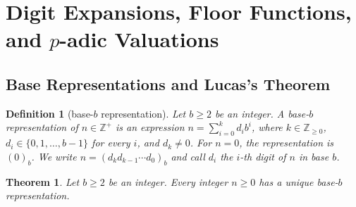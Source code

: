 \documentclass[11pt]{article}
\theoremstyle{ntstyle}
\newtheorem{theorem}{Theorem}[subsection]
\newtheorem{definition}{Definition}[subsection]
\begin{document}
\section{Digit Expansions, Floor Functions, and \texorpdfstring{$p$}{p}-adic Valuations}

\subsection{Base Representations and Lucas's Theorem}

\begin{definition}[base-$b$ representation]\label{def:4.1.1} Let $b\ge2$ be an integer.
	A base-$b$ representation of $n\in\mathbb{Z}^+$ is an expression
	$n=\sum_{i=0}^{k}d_i b^i$, where $k\in\mathbb{Z}_{\ge0}$,
	$d_i\in\{0,1,\ldots,b-1\}$ for every $i$, and $d_k\neq0$.
	For $n=0$, the representation is $(0)_b$. We write
	$n=(d_kd_{k-1}\cdots d_0)_b$ and call $d_i$ the $i$-th digit of $n$ in base $b$.

\end{definition}
\begin{theorem}\label{thm:4.1.1} Let $b\ge2$ be an integer. Every integer $n \ge 0$ has a
	unique base-$b$ representation.

\end{theorem}
\end{document}
